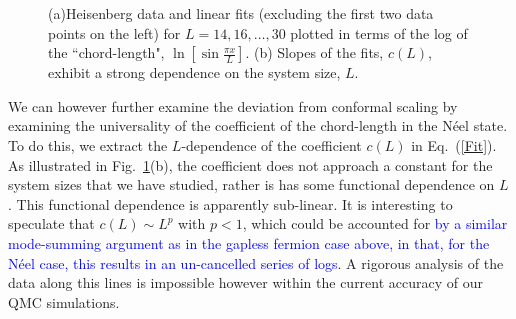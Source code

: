 \documentclass[prl,aps,twocolumn,floatfix,amsmath,amssymb,superscriptaddress,tightenlines]{revtex4}
\begin{document}
 \begin{figure}
   \begin{center}
   \end{center}
   \caption{(a)Heisenberg data and linear fits (excluding the first two data points on the left) for $L=14,16,\dots,30$ plotted in terms of the log of the ``chord-length", $\ln\left[\sin \frac{\pi x}{L}\right]$.
   (b) Slopes of the fits, $c(L)$, exhibit a strong dependence on the system size, $L$.
   }
   \label{fig:heis_lines}
 \end{figure}

We can however further examine the deviation from conformal scaling by examining the universality of the 
coefficient of the chord-length in the N\'eel state.
To do this, we extract the $L$-dependence of the coefficient $c(L)$ in Eq.~(\ref{Fit}).  As illustrated in Fig.~\ref{fig:heis_lines}(b),
the coefficient does not approach a constant for the system sizes that we have studied, rather is has some functional dependence on $L$.
This functional dependence is apparently sub-linear.  It is interesting to speculate that $c(L) \sim L^p$ with $p<1$,
which could be accounted for \textcolor{blue}{by a similar mode-summing argument as in the gapless fermion case above, in that, for the N\'eel case, 
this results in an un-cancelled series of logs}.  A rigorous analysis of the data along this lines is impossible however within the current
accuracy of our QMC simulations.
\end{document}

